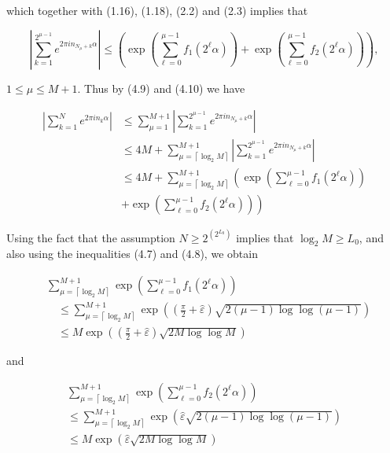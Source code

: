 \documentclass[10pt]{article}
\newcommand{\1}{\mathbf{1}}
\begin{document}
which together with (1.16), (1.18), (2.2) and (2.3) implies that

$$
\left|\sum_{k=1}^{2^{\mu-1}} e^{2 \pi i n_{N_{\mu}+k} \alpha}\right| \leqslant\left(\exp \left(\sum_{\ell=0}^{\mu-1} f_{1}\left(2^{\ell} \alpha\right)\right)+\exp \left(\sum_{\ell=0}^{\mu-1} f_{2}\left(2^{\ell} \alpha\right)\right)\right),
$$

$1 \leqslant \mu \leqslant M+1$. Thus by (4.9) and (4.10) we have


\begin{align*}
\left|\sum_{k=1}^{N} e^{2 \pi i n_{k} \alpha}\right| & \leqslant \sum_{\mu=1}^{M+1}\left|\sum_{k=1}^{2^{\mu-1}} e^{2 \pi i n_{N_{\mu}+k} \alpha}\right|  \tag{4.11}\\
& \leqslant 4 M+\sum_{\mu=\left\lceil\log _{2} M\right\rceil}^{M+1}\left|\sum_{k=1}^{2^{\mu-1}} e^{2 \pi i n_{N_{\mu}+k} \alpha}\right| \\
& \leqslant 4 M+\sum_{\mu=\left\lceil\log _{2} M\right\rceil}^{M+1}\left(\exp \left(\sum_{\ell=0}^{\mu-1} f_{1}\left(2^{\ell} \alpha\right)\right)\right.  \tag{4.12}\\
& \left.+\exp \left(\sum_{\ell=0}^{\mu-1} f_{2}\left(2^{\ell} \alpha\right)\right)\right)
\end{align*}


Using the fact that the assumption $N \geqslant 2^{\left(2^{L_{0}}\right)}$ implies that $\log _{2} M \geqslant L_{0}$, and also using the inequalities (4.7) and (4.8), we obtain


\begin{align*}
& \sum_{\mu=\left\lceil\log _{2} M\right\rceil}^{M+1} \exp \left(\sum_{\ell=0}^{\mu-1} f_{1}\left(2^{\ell} \alpha\right)\right)  \tag{4.13}\\
& \quad \leqslant \sum_{\mu=\left\lceil\log _{2} M\right\rceil}^{M+1} \exp \left(\left(\frac{\pi}{2}+\hat{\varepsilon}\right) \sqrt{2(\mu-1) \log \log (\mu-1)}\right) \\
& \quad \leqslant M \exp \left(\left(\frac{\pi}{2}+\hat{\varepsilon}\right) \sqrt{2 M \log \log M}\right)
\end{align*}


and


\begin{gather*}
\sum_{\mu=\left\lceil\log _{2} M\right\rceil}^{M+1} \exp \left(\sum_{\ell=0}^{\mu-1} f_{2}\left(2^{\ell} \alpha\right)\right)  \tag{4.14}\\
\leqslant \sum_{\mu=\left\lceil\log _{2} M\right\rceil}^{M+1} \exp (\hat{\varepsilon} \sqrt{2(\mu-1) \log \log (\mu-1)}) \\
\leqslant M \exp (\hat{\varepsilon} \sqrt{2 M \log \log M})
\end{gather*}
\end{document}

